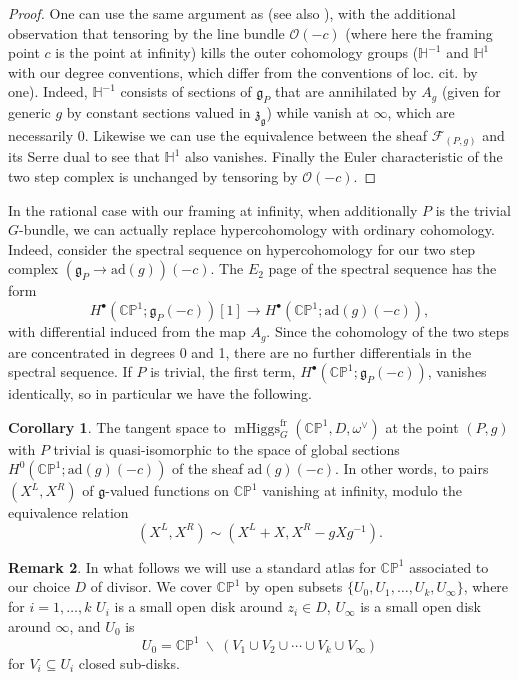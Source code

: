 \documentclass[11pt, oneside, reqno]{amsart}
\theoremstyle{definition} \newtheorem{definition}{Definition}[section]
\newtheorem{corollary}[definition]{Corollary}
\theoremstyle{definition} \newtheorem{remark}[definition]{Remark}
\theoremstyle{definition} \newtheorem{remarks}[definition]{Remarks}
\theoremstyle{definition} \newtheorem{question}[definition]{Question}
\theoremstyle{definition} \newtheorem*{note}{Note}
\theoremstyle{definition} \newtheorem{example}[definition]{Example}
\theoremstyle{definition} \newtheorem{examples}[definition]{Examples}
\renewcommand{\gg}{\mathfrak{g}}
\newcommand{\bb}[1]{\mathbb{#1}}
\newcommand{\mr}[1]{\mathrm{#1}}
\newcommand{\mc}[1]{\mathcal{#1}}
\newcommand{\mf}[1]{\mathfrak{#1}}
\newcommand{\bs}{\ \backslash \ }
\newcommand{\OO}{\mathcal{O}}
\newcommand{\sub}{\subseteq}
\DeclareMathOperator{\mhiggs}{mHiggs}
\newcommand{\fr}{\mathrm{fr}}
\newcommand{\ad}{\mr{ad}}
\begin{document}
\begin{proof}
One can use the same argument as \cite{HurtubiseMarkman} (see also \cite[Proposition 5.6]{CharbonneauHurtubise}), with the additional observation that tensoring by the line bundle $\OO(-c)$ (where here the framing point $c$ is the point at infinity) kills the outer cohomology groups ($\bb H^{-1}$ and $\bb H^1$ with our degree conventions, which differ from the conventions of loc. cit. by one).  Indeed, $\bb H^{-1}$ consists of sections of $\gg_P$ that are annihilated by $A_g$ (given for generic $g$ by constant sections valued in $\mf z_{\gg}$) while vanish at $\infty$, which are necessarily 0.  Likewise we can use the equivalence between the sheaf $\mc F_{(P,g)}$ and its Serre dual to see that $\bb H^1$ also vanishes.  Finally the Euler characteristic of the two step complex is unchanged by tensoring by $\OO(-c)$. 
\end{proof}

In the rational case with our framing at infinity, when additionally $P$ is the trivial $G$-bundle, we can actually replace hypercohomology with ordinary cohomology.  Indeed, consider the spectral sequence on hypercohomology for our two step complex $(\gg_P \to \ad(g))(-c)$.  The $E_2$ page of the spectral sequence has the form
\[H^\bullet(\bb{CP}^1; \gg_P(-c))[1] \to H^\bullet(\bb{CP}^1; \ad(g)(-c)),\]
with differential induced from the map $A_g$.  Since the cohomology of the two steps are concentrated in degrees 0 and 1, there are no further differentials in the spectral sequence.  If $P$ is trivial, the first term, $H^\bullet(\bb{CP}^1; \gg_P(-c))$, vanishes identically, so in particular we have the following.

\begin{corollary}
The tangent space to $\mhiggs^\fr_G(\bb{CP}^1, D, \omega^\vee)$ at the point $(P,g)$ with $P$ trivial is quasi-isomorphic to the space of global sections $H^0(\bb{CP}^1; \ad(g)(-c))$ of the sheaf $\ad(g)(-c)$.  In other words, to pairs $(X^L, X^R)$ of $\gg$-valued functions on $\bb{CP}^1$ vanishing at infinity, modulo the equivalence relation
\begin{equation}\label{eq:equivalence} 
(X^L, X^R) \sim (X^L + X, X^R - gXg^{-1}).
\end{equation}
\end{corollary}

\begin{remark} \label{atlas_remark}
In what follows we will use a standard atlas for $\bb{CP}^1$ associated to our choice $D$ of divisor.  We cover $\bb{CP}^1$ by open subsets $\{U_0, U_1, \ldots, U_k, U_\infty\}$, where for $i=1, \ldots, k$ $U_i$ is a small open disk around $z_i \in D$, $U_\infty$ is a small open disk around $\infty$, and $U_0$ is 
\[U_0 = \bb{CP}^1 \bs (V_1 \cup V_2 \cup \cdots \cup V_k \cup V_\infty)\]
for $V_i \sub U_i$ closed sub-disks.
\end{remark}
\end{document}
